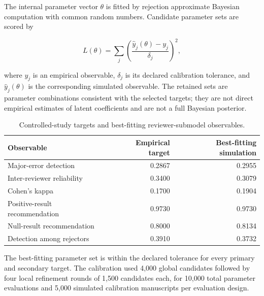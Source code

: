 \documentclass[11pt]{article}
\begin{document}
The internal parameter vector $\theta$ is fitted by rejection approximate Bayesian computation with common random numbers. Candidate parameter sets are scored by

\begin{equation}
L(\theta)=\sum_j
\left(
\frac{\widehat y_j(\theta)-y_j}{\delta_j}
\right)^2,
\end{equation}

where $y_j$ is an empirical observable, $\delta_j$ is its declared calibration tolerance, and $\widehat y_j(\theta)$ is the corresponding simulated observable. The retained sets are parameter combinations consistent with the selected targets; they are not direct empirical estimates of latent coefficients and are not a full Bayesian posterior.

\begin{table}[ht]
\centering
\caption{Controlled-study targets and best-fitting reviewer-submodel observables.}
\label{tab:empiricalcalibration}
\small
\begin{tabular}{lrr}
\toprule
Observable & Empirical target & Best-fitting simulation\\
\midrule
Major-error detection & 0.2867 & 0.2955\\
Inter-reviewer reliability & 0.3400 & 0.3079\\
Cohen's kappa & 0.1700 & 0.1904\\
Positive-result recommendation & 0.9730 & 0.9730\\
Null-result recommendation & 0.8000 & 0.8134\\
Detection among rejectors & 0.3910 & 0.3732\\
\bottomrule
\end{tabular}
\end{table}

The best-fitting parameter set is within the declared tolerance for every primary and secondary target. The calibration used 4,000 global candidates followed by four local refinement rounds of 1,500 candidates each, for 10,000 total parameter evaluations and 5,000 simulated calibration manuscripts per evaluation design.
\end{document}

